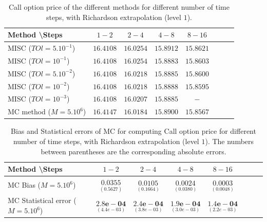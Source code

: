 \documentclass[11pt]{article}
\begin{document}
\begin{table}[h!]
	\centering
	\begin{tabular}{l*{6}{c}r}
		Method \textbackslash  Steps            & $1-2$ & $2-4$ & $4-8$ & $8-16$ &   \\
		\hline
		MISC ($TOl=5.10^{-1}$)  & $16.4108$ & $16.0254$ & $15.8912$ & $15.8621$  \\
		MISC ($TOl=10^{-1}$)  & $16.4108$ & $16.0254$ & $15.8883$ & $15.8603$  \\
		MISC ($TOl=5.10^{-2}$) & $16.4108$ & $16.0218$ & $15.8885$ & $15.8600$  \\
		MISC ($TOl=10^{-2}$) & $16.4108$& $16.0218$ & $15.8888$ & $15.8595$  \\
		MISC ($TOl=10^{-3}$) & $16.4108$ & $16.0207$ & $15.8885$ & $-$  \\
		
		\hline
		MC method ($M=5.10^{6}$)   & $  16.4147$ & $ 16.0184$ & $15.8900$ & $15.8567$  \\
		\hline
	\end{tabular}
	\caption{Call option price of the different methods for different number of time steps, with Richardson extrapolation (level $1$).}
	\label{table: Call option price of the different methods for different number of time steps, with Richardson extrapolation (level1).}
\end{table}


\begin{table}[h!]
	\centering
	\begin{tabular}{l*{6}{c}r}
		Method \textbackslash  Steps            & $1-2$ & $2-4$ & $4-8$ & $8-16$  \\
		\hline
		MC Bias ($M=5.10^6$)   & 	$ \underset{(    0.5627
			 )}{\mathbf{0.0355}}$  & $\underset{(  0.1664)}{\mathbf{ 0.0105
		}}$  & $\underset{( 0.0380)}{\mathbf{0.0024}}$ & $\underset{( 0.0048
	 )}{\mathbf{ 0.0003  }}$\\ 
		
		MC Statistical error ($M=5.10^6$)     & 	$ \underset{(  4.4e-03 )}{\mathbf{2.8e-04}}$  & $\underset{(3.8e-03 )}{\mathbf{ 2.4e-04
		}}$  & $\underset{(3.0e-03)}{\mathbf{1.9e-04}}$ & $\underset{(2.2e-03 )}{\mathbf{ 1.4e-04  }}$\\ 
		
		\hline
	\end{tabular}
	\caption{Bias and Statistical errors of MC  for computing Call option price  for different number of time steps, with Richardson extrapolation (level $1$). The numbers between parentheses are the corresponding absolute errors.}
	\label{Bias and Statistical errors of MC  for computing Call option price  for different number of time steps, with Richardson extrapolation (level $1$). The numbers between parentheses are the corresponding absolute errors.}
\end{table}
\end{document}
